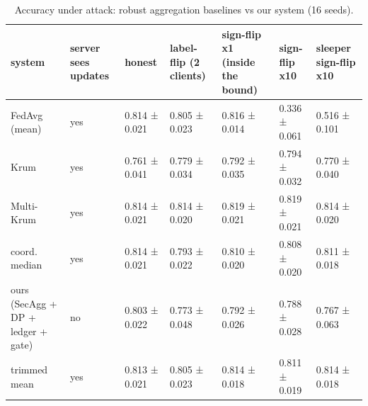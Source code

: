 \begin{table}
\caption{Accuracy under attack: robust aggregation baselines vs our system (16 seeds).}
\label{tab:T06_vs_robust_aggregation}
\begin{tabular}{lllllll}
\toprule
system & server sees updates & honest & label-flip (2 clients) & sign-flip x1 (inside the bound) & sign-flip x10 & sleeper sign-flip x10 \\
\midrule
FedAvg (mean) & yes & 0.814 ± 0.021 & 0.805 ± 0.023 & 0.816 ± 0.014 & 0.336 ± 0.061 & 0.516 ± 0.101 \\
Krum & yes & 0.761 ± 0.041 & 0.779 ± 0.034 & 0.792 ± 0.035 & 0.794 ± 0.032 & 0.770 ± 0.040 \\
Multi-Krum & yes & 0.814 ± 0.021 & 0.814 ± 0.020 & 0.819 ± 0.021 & 0.819 ± 0.021 & 0.814 ± 0.020 \\
coord. median & yes & 0.814 ± 0.021 & 0.793 ± 0.022 & 0.810 ± 0.020 & 0.808 ± 0.020 & 0.811 ± 0.018 \\
ours (SecAgg + DP + ledger + gate) & no & 0.803 ± 0.022 & 0.773 ± 0.048 & 0.792 ± 0.026 & 0.788 ± 0.028 & 0.767 ± 0.063 \\
trimmed mean & yes & 0.813 ± 0.021 & 0.805 ± 0.023 & 0.814 ± 0.018 & 0.811 ± 0.019 & 0.814 ± 0.018 \\
\bottomrule
\end{tabular}
\end{table}
